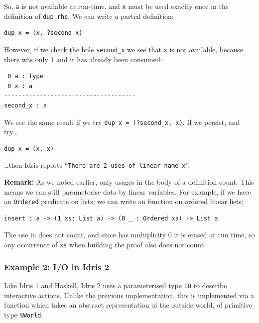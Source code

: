 So, \texttt{a} is not available at run-time, and \texttt{x} must be used
exactly once in the definition of \texttt{dup\_rhs}. We can write a
partial definition:

\begin{lstlisting}
dup x = (x, ?second_x)
\end{lstlisting}

However, if we check the hole \texttt{second\_x} we see that \texttt{x}
is not available, because there was only 1 and it has already been consumed:

\begin{lstlisting}
 0 a : Type
 0 x : a
-------------------------------------
second_x : a
\end{lstlisting}

We see the same result if we try \texttt{dup x = (?second\_x, x)}. If
we persist, and try\ldots

\begin{lstlisting}
dup x = (x, x)
\end{lstlisting}

\ldots then Idris reports ``\texttt{There are 2 uses of linear name x}''.

\textbf{Remark:} As we noted earlier, only usages in the body of a definition
count. This means we can still parameterise data by linear variables. For
example, if we have an \texttt{Ordered} predicate on lists, we can write
an  function on ordered linear lists:

\begin{lstlisting}
insert : a -> (1 xs: List a) -> (0 _ : Ordered xs) -> List a
\end{lstlisting}

The use in  does not count, and since  has multiplicity
$0$ it is erased at run time, so any occurrence of \texttt{xs} when
building the  proof also does not count.

\subsubsection{Example 2: I/O in Idris 2}

\label{sec:io}

Like Idris 1 and Haskell, Idris 2 uses a parameterised type \texttt{IO} to
describe interactive actions. Unlike the previous implementation, this is
implemented via a function which takes an abstract representation of the
outside world, of primitive type \texttt{\%World}:

